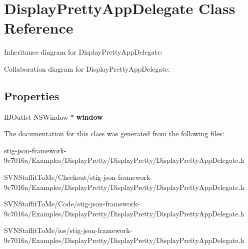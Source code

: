 \hypertarget{interface_display_pretty_app_delegate}{
\section{\-Display\-Pretty\-App\-Delegate \-Class \-Reference}
\label{interface_display_pretty_app_delegate}
}


\-Inheritance diagram for \-Display\-Pretty\-App\-Delegate\-:


\-Collaboration diagram for \-Display\-Pretty\-App\-Delegate\-:
\subsection*{\-Properties}
\begin{DoxyCompactItemize}
\item 
\hypertarget{interface_display_pretty_app_delegate_a2e392ce10b2094ec45dbb04061bba458}{
\-I\-B\-Outlet \-N\-S\-Window $\ast$ {\bfseries window}}
\label{interface_display_pretty_app_delegate_a2e392ce10b2094ec45dbb04061bba458}

\end{DoxyCompactItemize}


\-The documentation for this class was generated from the following files\-:\begin{DoxyCompactItemize}
\item 
stig-\/json-\/framework-\/9c7016a/\-Examples/\-Display\-Pretty/\-Display\-Pretty/\-Display\-Pretty\-App\-Delegate.\-h\item 
\-S\-V\-N\-Staffit\-To\-Me/\-Checkout/stig-\/json-\/framework-\/9c7016a/\-Examples/\-Display\-Pretty/\-Display\-Pretty/\-Display\-Pretty\-App\-Delegate.\-h\item 
\-S\-V\-N\-Staffit\-To\-Me/\-Code/stig-\/json-\/framework-\/9c7016a/\-Examples/\-Display\-Pretty/\-Display\-Pretty/\-Display\-Pretty\-App\-Delegate.\-h\item 
\-S\-V\-N\-Staffit\-To\-Me/ios/stig-\/json-\/framework-\/9c7016a/\-Examples/\-Display\-Pretty/\-Display\-Pretty/\-Display\-Pretty\-App\-Delegate.\-h\end{DoxyCompactItemize}
